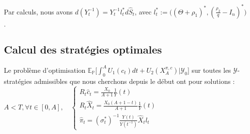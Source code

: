 \documentclass[../finalreport.tex]{subfiles}
\begin{document}
Par calculs, nous avons $\displaystyle d(Y^{-1}_t) = Y^{-1}_t l^*_t d\widehat{S}_t$, avec $\displaystyle l^*_t := \big((\Theta + \rho_1)^*, (\frac{\rho_2}{q} - I_n)^*\big)$.\\

\subsection{Calcul des stratégies optimales}
Le problème d'optimisation $ \mathbb{E}_{\mathbb{P}} \Big[ \displaystyle \int_{0}^{A} U_1(c_t)dt + U_2(X_A^{\pi, c})\Big|\mathcal{Y}_0\Big]$ sur toutes les $\mathcal{Y}$-stratégies admissibles que nous cherchons depuis le début ont pour solutions : \\
 
$A<T, \forall t \in [0, A], \quad \begin{cases}
\displaystyle R_t \widehat{c}_t = \frac{X_0}{A+1} \frac{1}{Y}(t)\\
\displaystyle R_t \widehat{X}_t = \frac{X_0(A+1-t)}{A+1}\frac{1}{Y}(t)\\
\displaystyle \widehat{\pi}_t = (\sigma^*_t)^{-1}\frac{Y(t)}{Y(t^{-1})}\widehat{X}_t l_t
\end{cases}$
\end{document}

